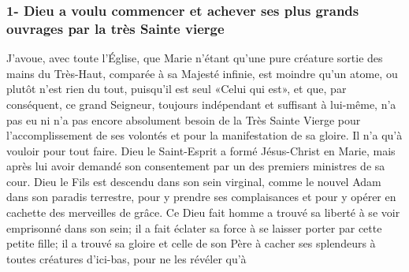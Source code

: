 \subsubsection{1- Dieu a voulu commencer et achever ses plus grands ouvrages par la très Sainte vierge}

 J'avoue, avec toute l'Église, que Marie n'étant qu'une pure créature sortie des mains du Très-Haut, comparée
à sa Majesté infinie, est moindre qu'un atome, ou plutôt n'est rien du tout, puisqu'il est seul «Celui qui est», et que,
par conséquent, ce grand Seigneur, toujours indépendant et suffisant à lui-même, n'a pas eu ni n'a pas encore
absolument besoin de la Très Sainte Vierge pour l'accomplissement de ses volontés et pour la manifestation de sa
gloire. Il n'a qu'à vouloir pour tout faire.
 
 
Dieu le Saint-Esprit a formé Jésus-Christ en Marie, mais après lui avoir demandé son consentement par un des
premiers ministres de sa cour.
 
 Dieu le Fils est descendu dans son sein virginal, comme le nouvel Adam dans son paradis terrestre, pour y
prendre ses complaisances et pour y opérer en cachette des merveilles de grâce. Ce Dieu fait homme a trouvé sa
liberté à se voir emprisonné dans son sein; il a fait éclater sa force à se laisser porter par cette petite fille; il a
trouvé sa gloire et celle de son Père à cacher ses splendeurs à toutes créatures d'ici-bas, pour ne les révéler qu'à
